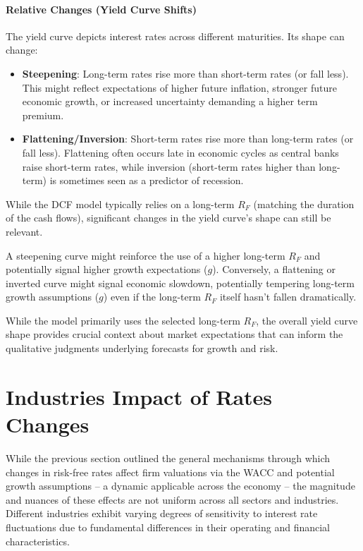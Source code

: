 \paragraph{Relative Changes (Yield Curve Shifts)}
The yield curve depicts interest rates across different maturities. Its shape can change:
\begin{itemize}
    \item \textbf{Steepening}: Long-term rates rise more than short-term rates (or fall less). This might reflect expectations of higher future inflation, stronger future economic growth, or increased uncertainty demanding a higher term premium.
    \item \textbf{Flattening/Inversion}: Short-term rates rise more than long-term rates (or fall less). Flattening often occurs late in economic cycles as central banks raise short-term rates, while inversion (short-term rates higher than long-term) is sometimes seen as a predictor of recession.
\end{itemize}

While the DCF model typically relies on a long-term \(R_F\) (matching the duration of the cash flows), significant changes in the yield curve's shape can still be relevant.

A steepening curve might reinforce the use of a higher long-term \(R_F\) and potentially signal higher growth expectations (\(g\)). Conversely, a flattening or inverted curve might signal economic slowdown, potentially tempering long-term growth assumptions (\(g\)) even if the long-term \(R_F\) itself hasn't fallen dramatically. 

While the model primarily uses the selected long-term \(R_F\), the overall yield curve shape provides crucial context about market expectations that can inform the qualitative judgments underlying forecasts for growth and risk.

\section{Industries Impact of Rates Changes} \label{sec:industry_impact_rates}

While the previous section outlined the general mechanisms through which changes in risk-free rates affect firm valuations via the WACC and potential growth assumptions – a dynamic applicable across the economy – the magnitude and nuances of these effects are not uniform across all sectors and industries. Different industries exhibit varying degrees of sensitivity to interest rate fluctuations due to fundamental differences in their operating and financial characteristics.

